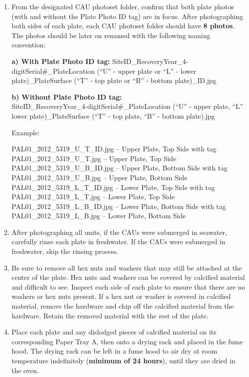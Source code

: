 \documentclass[]{book}
\begin{document}
\begin{enumerate}
\def\labelenumi{\arabic{enumi}.}
\setcounter{enumi}{8}
\item
  From the designated CAU photoset folder, confirm that both plate photos (with and without the Plate Photo ID tag) are in focus. After photographing both sides of each plate, each CAU photoset folder should have \textbf{8 photos}. The photos should be later on renamed with the following naming convention:

  \textbf{a) With Plate Photo ID tag:}
  SiteID\_RecoveryYear\_4-digitSerial\#\_PlateLocation (``U'' - upper plate or ``L'' - lower plate)\_PlateSurface (``T'' - top plate or ``B'' - bottom plate)\_ID.jpg

  \textbf{b) Without Plate Photo ID tag:}\\
  SiteID\_RecoveryYear\_4-digitSerial\#\_PlateLocation (``U'' - upper plate, ``L'' lower plate)\_PlateSurface (``T'' - top plate, ``B'' - bottom plate).jpg

  Example:

  PAL01\_2012\_5319\_U\_T\_ID.jpg -- Upper Plate, Top Side with tag\\
  PAL01\_2012\_5319\_U\_T.jpg -- Upper Plate, Top Side\\
  PAL01\_2012\_5319\_U\_B\_ID.jpg -- Upper Plate, Bottom Side with tag
  PAL01\_2012\_5319\_U\_B.jpg -- Upper Plate, Bottom Side\\
  PAL01\_2012\_5319\_L\_T\_ID.jpg -- Lower Plate, Top Side with tag\\
  PAL01\_2012\_5319\_L\_T.jpg -- Lower Plate, Top Side\\
  PAL01\_2012\_5319\_L\_B\_ID.jpg -- Lower Plate, Bottom Side with tag\\
  PAL01\_2012\_5319\_L\_B.jpg -- Lower Plate, Bottom Side
\item
  After photographing all units, if the CAUs were submerged in seawater, carefully rinse each plate in freshwater. If the CAUs were submerged in freshwater, skip the rinsing process.
\item
  Be sure to remove all hex nuts and washers that may still be attached at the center of the plate. Hex nuts and washers can be covered by calcified material and difficult to see. Inspect each side of each plate to ensure that there are no washers or hex nuts present. If a hex nut or washer is covered in calcified material, remove the hardware and chip off the calcified material from the hardware. Retain the removed material with the rest of the plate.
\item
  Place each plate and any dislodged pieces of calcified material on its corresponding Paper Tray A, then onto a drying rack and placed in the fume hood. The drying rack can be left in a fume hood to air dry at room temperature indefinitely (\textbf{minimum of 24 hours}), until they are dried in the oven.
\end{enumerate}
\end{document}
